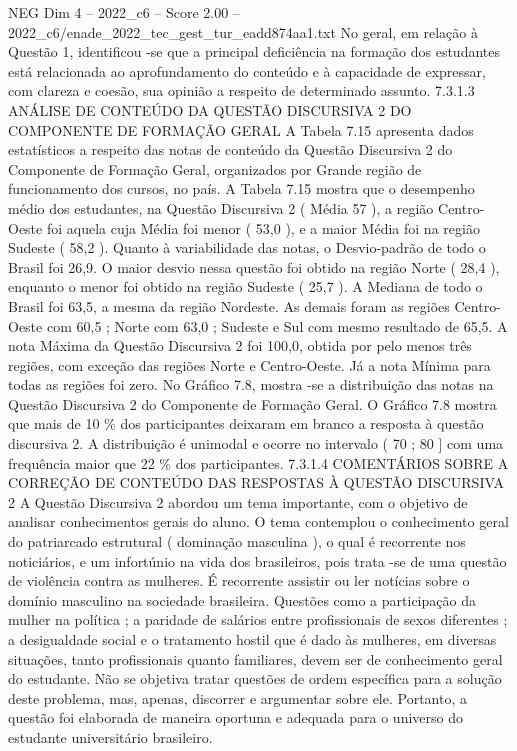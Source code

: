 \begin{textsample}{NEG Dim 4 – 2022\_c6 – Score 2.00 – 2022\_c6/enade\_2022\_tec\_gest\_tur\_eadd874aa1.txt}
No geral, em relação à Questão 1, identificou -se que a principal deficiência na formação dos estudantes está relacionada ao aprofundamento do conteúdo e à capacidade de expressar, com clareza e coesão, sua opinião a respeito de determinado assunto. 7.3.1.3 ANÁLISE DE CONTEÚDO DA QUESTÃO DISCURSIVA 2 DO COMPONENTE DE FORMAÇÃO GERAL A Tabela 7.15 apresenta dados estatísticos a respeito das notas de conteúdo da Questão Discursiva 2 do Componente de Formação Geral, organizados por Grande região de funcionamento dos cursos, no país.
A Tabela 7.15 mostra que o desempenho médio dos estudantes, na Questão Discursiva 2 ( Média 57 ), a região Centro-Oeste foi aquela cuja Média foi menor ( 53,0 ), e a maior Média foi na região Sudeste ( 58,2 ).
Quanto à variabilidade das notas, o Desvio-padrão de todo o Brasil foi 26,9.
O maior desvio nessa questão foi obtido na região Norte ( 28,4 ), enquanto o menor foi obtido na região Sudeste ( 25,7 ).
A Mediana de todo o Brasil foi 63,5, a mesma da região Nordeste.
As demais foram as regiões Centro-Oeste com 60,5 ; Norte com 63,0 ; Sudeste e Sul com mesmo resultado de 65,5.
A nota Máxima da Questão Discursiva 2 foi 100,0, obtida por pelo menos três regiões, com exceção das regiões Norte e Centro-Oeste.
Já a nota Mínima para todas as regiões foi zero.
No Gráfico 7.8, mostra -se a distribuição das notas na Questão Discursiva 2 do Componente de Formação Geral.
O Gráfico 7.8 mostra que mais de 10 \% dos participantes deixaram em branco a resposta à questão discursiva 2.
A distribuição é unimodal e ocorre no intervalo ( 70 ; 80 ] com uma frequência maior que 22 \% dos participantes. 7.3.1.4 COMENTÁRIOS SOBRE A CORREÇÃO DE CONTEÚDO DAS RESPOSTAS À QUESTÃO DISCURSIVA 2 A Questão Discursiva 2 abordou um tema importante, com o objetivo de analisar conhecimentos gerais do aluno.
O tema contemplou o conhecimento geral do patriarcado estrutural ( dominação masculina ), o qual é recorrente nos noticiários, e um infortúnio na vida dos brasileiros, pois trata -se de uma questão de violência contra as mulheres.
É recorrente assistir ou ler notícias sobre o domínio masculino na sociedade brasileira.
Questões como a participação da mulher na política ; a paridade de salários entre profissionais de sexos diferentes ; a desigualdade social e o tratamento hostil que é dado às mulheres, em diversas situações, tanto profissionais quanto familiares, devem ser de conhecimento geral do estudante.
Não se objetiva tratar questões de ordem específica para a solução deste problema, mas, apenas, discorrer e argumentar sobre ele.
Portanto, a questão foi elaborada de maneira oportuna e adequada para o universo do estudante universitário brasileiro.

\end{textsample}
